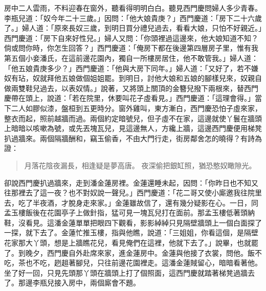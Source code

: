 房中二人雲雨，不料迎春在窗外，聽看得明明白白。聽見西門慶問婦人多少青春。李瓶兒道：「奴今年二十三歲。」因問：「他大娘貴庚？」西門慶道：「房下二十六歲了。」婦人道：「原來長奴三歲，到明日買分禮兒過去，看看大娘，只怕不好親近。」西門慶道：「房下自來好性兒。」婦人又問：「你頭裡過這邊來，他大娘知道不知？倘或問你時，你怎生回答？」西門慶道：「俺房下都在後邊第四層房子里，惟有我第五個小妾潘氏，在這前邊花園內，獨自一所樓房居住，他不敢管我。」婦人道：「他五娘貴庚多少？」西門慶道：「他與大房下同年。」婦人道：「又好了，若不嫌奴有玷，奴就拜他五娘做個姐姐罷。到明日，討他大娘和五娘的腳樣兒來，奴親自做兩雙鞋兒過去，以表奴情。」說著，又將頭上關頂的金簪兒撥下兩根來，替西門慶帶在頭上，說道：「若在院里，休要叫花子虛看見。」西門慶道：「這理會得。」當下二人如膠似漆，盤桓到五更時分。窗外雞叫，東方漸白，西門慶恐怕子虛來家，整衣而起，照前越牆而過。兩個約定暗號兒，但子虛不在家，這邊就使丫鬟在牆頭上暗暗以咳嗽為號，或先丟塊瓦兒，見這邊無人，方纔上牆，這邊西門慶便用梯凳扒過牆來。兩個隔牆酬和，竊玉偷香，不由大門行走，街房鄰舍怎的曉得？有詩為證：
\begin{quote}
月落花陰夜漏長，相逢疑是夢高唐。
夜深偷把銀缸照，猶恐憨奴瞰隙光。
\end{quote}

卻說西門慶扒過牆來，走到潘金蓮房裡。金蓮還睡未起，因問：「你昨日也不知又往那裡去了這一夜？也不對奴說一聲兒。」西門慶道：「花二哥又使小廝邀我往院里去，吃了半夜酒，才脫身走來家。」金蓮雖故信了，還有幾分疑影在心。一日，同孟玉樓飯後在花園亭子上做針指，猛可見一塊瓦兒打在面前。那孟玉樓低著頭納鞋，沒看見。這潘金蓮單單把眼四下觀看，影影綽綽只見隔壁牆頭上一個白面探了一探，就下去了。金蓮忙推玉樓，指與他瞧，說道：「三姐姐，你看這個，是隔壁花家那大丫頭，想是上牆瞧花兒，看見俺們在這裡，他就下去了。」說畢，也就罷了。到晚夕，西門慶自外赴席來家，進金蓮房中。金蓮與他接了衣裳，問他。飯不吃，茶也不吃，趔趄著腳兒，只往前邊花園裡走。這潘金蓮賊留心，暗暗看著他。坐了好一回，只見先頭那丫頭在牆頭上打了個照面，這西門慶就踏著梯凳過牆去了。那邊李瓶兒接入房中，兩個廝會不題。

